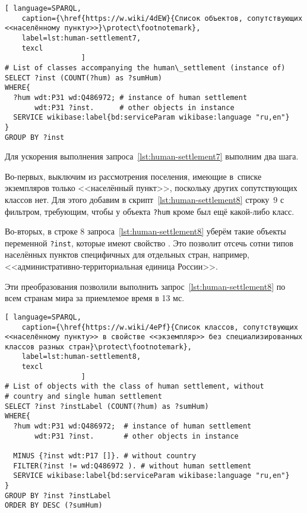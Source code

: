 \begin{lstlisting}[ language=SPARQL, 
    caption={\href{https://w.wiki/4dEW}{Cписок объектов, сопутствующих <<населённому пункту>>}\protect\footnotemark},
    label=lst:human-settlement7,
    texcl 
                  ]
# List of classes accompanying the human\_settlement (instance of)
SELECT ?inst (COUNT(?hum) as ?sumHum) 
WHERE{          
  ?hum wdt:P31 wd:Q486972; # instance of human settlement
       wdt:P31 ?inst.      # other objects in instance
  SERVICE wikibase:label{bd:serviceParam wikibase:language "ru,en"}
}  
GROUP BY ?inst
\end{lstlisting}%

Для ускорения выполнения запроса~\ref{lst:human-settlement7} выполним два шага.
 
Во-первых, выключим из рассмотрения поселения, 
имеющие в~списке экземпляров только <<населённый пункт>>, 
поскольку других сопутствующих классов нет. 
Для этого добавим в скрипт~\ref{lst:human-settlement8} строку~\num{9} с фильтром, 
требующим, чтобы у объекта \lstinline|?hum| 
кроме   был ещё какой-либо класс.

Во-вторых, в строке \num{8} запроса~\ref{lst:human-settlement8} 
уберём такие объекты переменной \lstinline|?inst|, 
которые имеют свойство . 
Это позволит отсечь сотни типов населённых пунктов специфичных для отдельных стран, 
например, <<административно-территориальная единица России>>.

Эти преобразования позволили выполнить запрос~\ref{lst:human-settlement8} 
по всем странам мира за приемлемое время в 13 мс.

\lstset{numbers=left, firstnumber=1, frame=single}
\begin{lstlisting}[ language=SPARQL, 
    caption={\href{https://w.wiki/4ePf}{Cписок классов, сопутствующих <<населённому пункту>> в свойстве <<экземпляр>> без специализированных классов разных стран}\protect\footnotemark},
    label=lst:human-settlement8,
    texcl 
                  ]
# List of objects with the class of human settlement, without 
# country and single human settlement
SELECT ?inst ?instLabel (COUNT(?hum) as ?sumHum) 
WHERE{ 
  ?hum wdt:P31 wd:Q486972;  # instance of human settlement
       wdt:P31 ?inst.       # other objects in instance
  
  MINUS {?inst wdt:P17 []}. # without country
  FILTER(?inst != wd:Q486972 ). # without human settlement
  SERVICE wikibase:label{bd:serviceParam wikibase:language "ru,en"}
}  
GROUP BY ?inst ?instLabel
ORDER BY DESC (?sumHum)
\end{lstlisting}%

